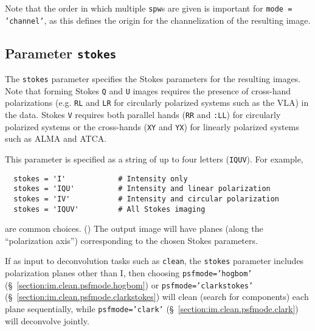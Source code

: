 Note that the order in which multiple {\tt spw}s are given is
important for {\tt mode = 'channel'}, as
this defines the origin for the channelization of the resulting
image.

\subsection{Parameter {\tt stokes} }
\label{section:im.pars.stokes}

The {\tt stokes} parameter specifies the Stokes parameters for the
resulting images.  Note that forming Stokes {\tt Q} and {\tt U} images
requires the presence of
cross-hand polarizations (e.g. {\tt RL} and {\tt LR} for circularly
polarized systems such as the VLA) in the data.  
Stokes {\tt V} requires both parallel
hands ({\tt RR} and {\tt :LL}) for circularly polarized systems or
the cross-hands ({\tt XY} and {\tt YX}) for linearly polarized systems
such as ALMA and ATCA.

This parameter is specified as a string of up to four letters ({\tt IQUV}).
For example,
\small
\begin{verbatim}
  stokes = 'I'            # Intensity only
  stokes = 'IQU'          # Intensity and linear polarization
  stokes = 'IV'           # Intensity and circular polarization
  stokes = 'IQUV'         # All Stokes imaging
\end{verbatim}
\normalsize
are common choices. ()
The output image will have planes (along the ``polarization axis'')
corresponding to the chosen Stokes parameters.  

If as input to deconvolution tasks such as {\tt clean}, the {\tt stokes} parameter
includes polarization planes other than I, then choosing {\tt psfmode='hogbom'} 
(\S~\ref{section:im.clean.psfmode.hogbom}) or {\tt psfmode='clarkstokes'} 
(\S~\ref{section:im.clean.psfmode.clarkstokes}) will clean (search for
components) each plane sequentially, while {\tt psfmode='clark'} 
(\S~\ref{section:im.clean.psfmode.clark}) will deconvolve jointly.



